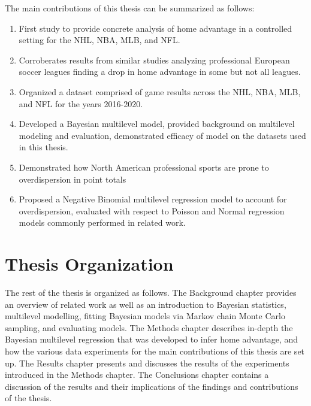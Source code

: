 The main contributions of this thesis can be summarized as follows:
\begin{enumerate}
	\item First study to provide concrete analysis of home advantage in a controlled setting for the NHL, NBA, MLB, and NFL.
	\item Corroberates results from similar studies analyzing professional European soccer leagues finding a drop in home advantage in some but not all leagues.
	\item Organized a dataset comprised of game results across the NHL, NBA, MLB, and NFL for the years 2016-2020.
	\item Developed a Bayesian multilevel model, provided background on multilevel modeling and evaluation, demonstrated efficacy of model on the datasets used in this thesis.
	\item Demonstrated how North American professional sports are prone to overdispersion in point totals
	\item Proposed a Negative Binomial multilevel regression model to account for overdispersion, evaluated with respect to Poisson and Normal regression models commonly performed in related work.
\end{enumerate}

\section{Thesis Organization}

The rest of the thesis is organized as follows. The Background chapter provides an overview of related work as well as an introduction to Bayesian statistics, multilevel modelling, fitting Bayesian models via Markov chain Monte Carlo sampling, and evaluating models. The Methods chapter describes in-depth the Bayesian multilevel regression that was developed to infer home advantage, and how the various data experiments for the main contributions of this thesis are set up. The Results chapter presents and discusses the results of the experiments introduced in the Methods chapter. The Conclusions chapter contains a discussion of the results and their implications of the findings and contributions of the thesis.
